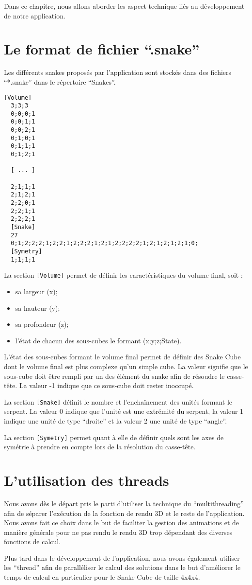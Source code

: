 Dans ce chapitre, nous allons aborder les aspect technique liés au développement de notre application.

\section{Le format de fichier ``.snake''}
Les différents snakes proposés par l'application sont stockés dans des fichiers ``*.snake'' dans le répertoire ``Snakes''.

\begin{lstlisting}[caption=Contenu du fichier snake.snake]
 [Volume]
  3;3;3
  0;0;0;1
  0;0;1;1
  0;0;2;1
  0;1;0;1
  0;1;1;1
  0;1;2;1
 
  [ ... ]
 
  2;1;1;1
  2;1;2;1
  2;2;0;1
  2;2;1;1
  2;2;2;1
  [Snake]
  27
  0;1;2;2;2;1;2;2;1;2;2;2;1;2;1;2;2;2;2;1;2;1;2;1;2;1;0;
  [Symetry]
  1;1;1;1
\end{lstlisting}

\newpage
La section \verb|[Volume]| permet de définir les caractéristiques du volume final, soit :
\begin{itemize}
 \item sa largeur (x);
 \item sa hauteur (y);
 \item sa profondeur (z);
 \item l'état de chacun des sous-cubes le formant (x;y;z;State).
\end{itemize}

L'état des sous-cubes formant le volume final permet de définir des Snake Cube dont le volume final est plus complexe qu'un simple cube. La valeur signifie que le sous-cube doit être rempli par un des élément du snake afin de résoudre le casse-tête. La valeur -1 indique que ce sous-cube doit rester inoccupé.

La section \verb|[Snake]| définit le nombre et l’enchaînement des unités formant le serpent. La valeur 0 indique que l'unité est une extrémité du serpent, la valeur 1 indique une unité de type ``droite'' et la valeur 2 une unité de type ``angle''.

La section \verb|[Symetry]| permet quant à elle de définir quels sont les axes de symétrie à prendre en compte lors de la résolution du casse-tête.

\section{L'utilisation des threads}
Nous avons dès le départ pris le parti d'utiliser la technique du ``multithreading'' afin de séparer l’exécution de la fonction de rendu 3D et le reste de l'application. Nous avons fait ce choix dans le but de faciliter la gestion des animations et de manière générale pour ne pas rendu le rendu 3D trop dépendant des diverses fonctions de calcul.

Plus tard dans le développement de l'application, nous avons également utiliser les ``thread'' afin de paralléliser le calcul des solutions dans le but d’améliorer le temps de calcul en particulier pour le Snake Cube de taille 4x4x4.